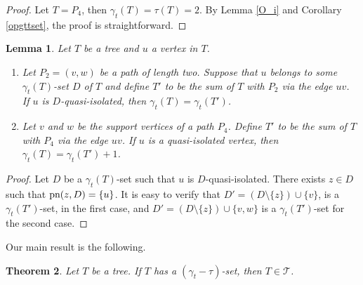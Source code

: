 \documentclass[12pt]{article}%
\newtheorem{theorem}{Theorem}
\newtheorem{lemma}[theorem]{Lemma}
\theoremstyle{definition}
\begin{document}
\begin{proof}
Let $T=P_4$, then $\gamma_t (T) = \tau (T)=2$. By Lemma
\ref{O_i} and Corollary \ref{opgttset}, the proof is straightforward.   
\end{proof}


\begin{lemma} \label{quasi-isolated}
Let $T$ be a tree and $u$ a vertex in $T$.
\begin{enumerate}
	\item Let $P_2=(v,w)$ be a path of length two. Suppose
		that $u$ belongs to some $\gamma_t(T)$-set $D$
		of $T$ and define $T'$ to be the sum of $T$ with
		$P_2$ via the edge $uv$.   If $u$ is $D$-quasi-isolated,
		then $\gamma_t (T) = \gamma_t (T')$.
	
	\item Let $v$ and $w$ be the support vertices of a path
		$P_4$.   Define $T'$ to be the sum of $T$ with $P_4$
		via the edge $uv$.   If $u$ is a quasi-isolated vertex,
		then $\gamma_t (T) = \gamma_t (T') + 1$.
\end{enumerate}
\end{lemma}

\begin{proof}
Let $D$ be a $\gamma_t (T)$-set such that $u$ is
$D$-quasi-isolated.   There exists $z \in D$ such that
$\textnormal{pn} (z, D) = \{ u \}$.  It is easy to verify that $D'
= (D \setminus \{ z \}) \cup \{ v \}$, is a $\gamma_t (T')$-set,
in the first case, and $D' = (D \setminus \{ z \}) \cup \{ v, w \}$
is a $\gamma_t (T')$-set for the second case.
\end{proof}


Our main result is the following.


\begin{theorem}
Let $T$ be a tree.   If $T$ has a $(\gamma_t-\tau)$-set,
then  $T \in \mathcal{T}$.
\end{theorem}
\end{document}
